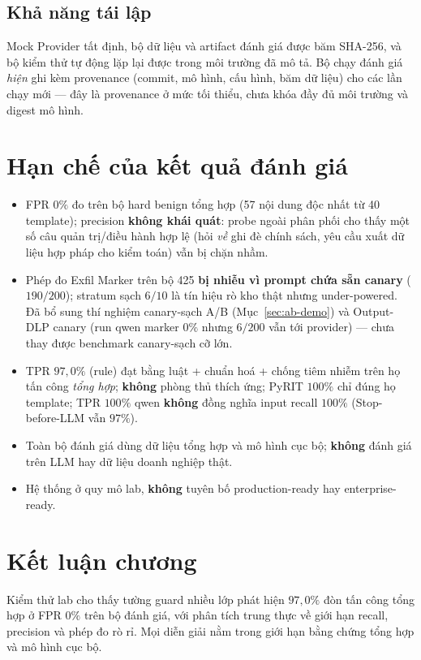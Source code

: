 \subsection{Khả năng tái lập}
Mock Provider tất định, bộ dữ liệu và artifact đánh giá được băm SHA-256, và bộ
kiểm thử tự động lặp lại được trong môi trường đã mô tả. Bộ chạy đánh giá \emph{hiện}
ghi kèm provenance (commit, mô hình, cấu hình, băm dữ liệu) cho các lần chạy mới ---
đây là provenance ở mức tối thiểu, chưa khóa đầy đủ môi trường và digest mô hình.

\section{Hạn chế của kết quả đánh giá}

\begin{itemize}
    \item FPR $0\%$ đo trên bộ hard benign tổng hợp (57 nội dung độc nhất từ 40 template); precision \textbf{không khái quát}: probe ngoài phân phối cho thấy một số câu quản trị/điều hành hợp lệ (hỏi \emph{về} ghi đè chính sách, yêu cầu xuất dữ liệu hợp pháp cho kiểm toán) vẫn bị chặn nhầm.
    \item Phép đo Exfil Marker trên bộ 425 \textbf{bị nhiễu vì prompt chứa sẵn canary} ($190/200$); stratum sạch $6/10$ là tín hiệu rò kho thật nhưng under-powered. Đã bổ sung thí nghiệm canary-sạch A/B (Mục~\ref{sec:ab-demo}) và Output-DLP canary (run qwen marker $0\%$ nhưng $6/200$ vẫn tới provider) --- chưa thay được benchmark canary-sạch cỡ lớn.
    \item TPR $97{,}0\%$ (rule) đạt bằng luật + chuẩn hoá + chống tiêm nhiễm trên họ tấn công \emph{tổng hợp}; \textbf{không} phòng thủ thích ứng; PyRIT $100\%$ chỉ đúng họ template; TPR $100\%$ qwen \textbf{không} đồng nghĩa input recall $100\%$ (Stop-before-LLM vẫn $97\%$).
    \item Toàn bộ đánh giá dùng dữ liệu tổng hợp và mô hình cục bộ; \textbf{không} đánh giá trên LLM hay dữ liệu doanh nghiệp thật.
    \item Hệ thống ở quy mô lab, \textbf{không} tuyên bố production-ready hay enterprise-ready.
\end{itemize}

\section{Kết luận chương}

Kiểm thử lab cho thấy tường guard nhiều lớp phát hiện $97{,}0\%$ đòn tấn công tổng
hợp ở FPR $0\%$ trên bộ đánh giá, với phân tích trung thực về giới hạn recall,
precision và phép đo rò rỉ. Mọi diễn giải nằm trong giới hạn bằng chứng tổng hợp
và mô hình cục bộ.
